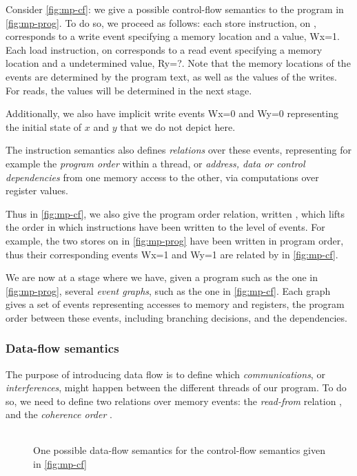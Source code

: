 \documentclass[a4paper]{article}
\begin{document}
Consider \myfig\ref{fig:mp-cf}: we give a possible control-flow semantics to
the program in \myfig\ref{fig:mp-prog}. To do so, we proceed as follows: each
store instruction, \eg {} on , corresponds to a write event
specifying a memory location and a value, \eg Wx=1. Each load instruction, \eg
{} on  corresponds to a read event specifying a memory
location and a undetermined value, \eg Ry=?.  Note that the memory locations of
the events are determined by the program text, as well as the values of the
writes. For reads, the values will be determined in the next stage.

Additionally, we also have implicit write events Wx=0 and Wy=0 representing the
initial state of $x$ and $y$ that we do not depict here.

The instruction semantics also defines \emph{relations} over these events,
representing for example the \emph{program order} within a thread, or
\emph{address, data or control dependencies} from one memory access to the
other, via computations over register values.

Thus in \myfig\ref{fig:mp-cf}, we also give the program order relation, written
\po{}, which lifts the order in which instructions have been written to the
level of events. For example, the two stores on  in
\myfig\ref{fig:mp-prog} have been written in program order, thus their
corresponding events Wx=1 and Wy=1 are related by \po{} in
\myfig\ref{fig:mp-cf}.

We are now at a stage where we have, given a program such as the one in
\myfig\ref{fig:mp-prog}, several \emph{event graphs}, such as the one in
\myfig\ref{fig:mp-cf}. Each graph gives a set of events representing accesses
to memory and registers, the program order between these events, including
branching decisions, and the dependencies.

\subsubsection{Data-flow semantics}
The purpose of introducing data flow is to define which \emph{communications},
or \emph{interferences}, might happen between the different threads of our
program. To do so, we need to define two relations over memory events: the
\emph{read-from} relation \rf{}, and the \emph{coherence order} \co{}.

\begin{figure}[!h]
\begin{center}
\begin{tabular}{cc}
\end{tabular}
\end{center}
\caption{One possible data-flow semantics for the control-flow semantics given in \myfig\ref{fig:mp-cf}\label{fig:mp-df}}
\end{figure}
\end{document}
